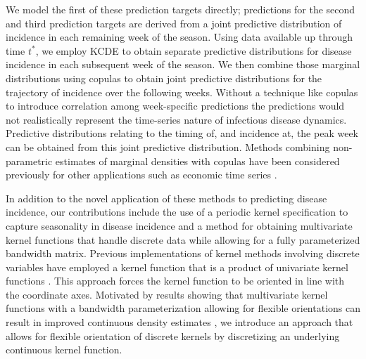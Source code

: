 \documentclass[times, doublespace]{simauth}\usepackage[]{graphicx}\usepackage[]{color}
\begin{document}
We model the first of these prediction targets directly; predictions for the second and third prediction targets are derived from a joint predictive distribution of incidence in each remaining week of the season.  Using data available up through time $t^*$, we employ KCDE
to obtain separate predictive distributions for disease incidence in each subsequent week of the season.
We then combine those marginal distributions using copulas to obtain joint predictive distributions for the
trajectory of incidence over the following weeks.  Without a technique
like copulas to introduce correlation among week-specific predictions
the predictions would not realistically represent the time-series nature
of infectious disease dynamics.  Predictive
distributions relating to the timing of, and incidence at, the peak week can be
obtained from this joint predictive distribution.  Methods combining non-parametric
estimates of marginal densities with copulas have been considered previously for
other applications such as economic time series
\cite{patton2012reviewCopulaEconomicTimeSeries}.

In addition to the novel application of these methods to predicting
disease incidence, our contributions include the use of a periodic kernel
specification to capture seasonality in disease incidence and a method for
obtaining multivariate kernel functions that handle discrete data while allowing
for a fully parameterized bandwidth matrix.
Previous implementations of kernel methods involving discrete variables have
employed a kernel function that is a product of univariate kernel functions
\cite{aitchison1976multivariateBinaryKernel,
bowman1980ConsistencyKernelCategorical,
grund1993kernelCellProb,
hall2004crossvalidationKCDE,
hall2007nonparametricRegressionIrrelevantRegressors,
li2003nonparametricEstDistnsCategoricalContinuous,
li2008nonparametricConditionalCDFQuantile,
ouyang2006crossvalidationEstDistnCategorical,
racine2004kernelEstConditionalDistns}.
This approach forces the
kernel function to be oriented in line with the coordinate axes.
Motivated by results showing that multivariate
kernel functions with a bandwidth parameterization allowing for
flexible orientations can result in improved continuous density estimates
\cite{duong2005crossvalidationBandwidthMultivariateKDE}, we introduce an
approach that allows for flexible orientation of discrete kernels by
discretizing an underlying continuous kernel function.

\end{document}
